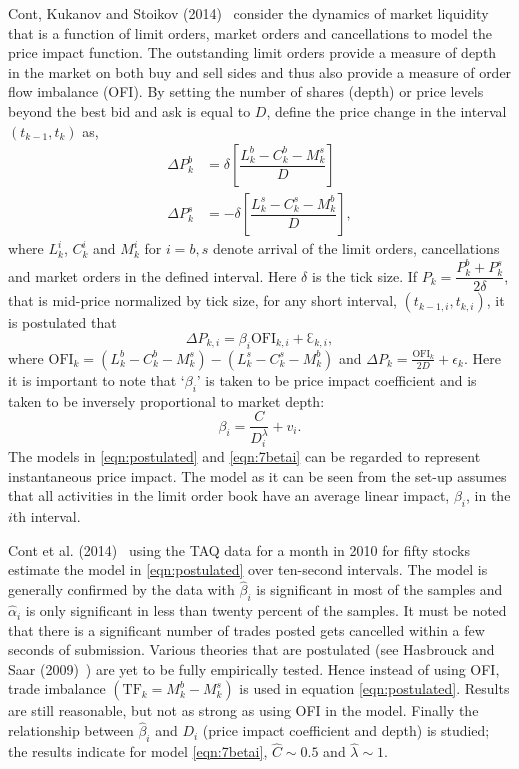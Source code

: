 Cont, Kukanov and Stoikov (2014)~\cite{contkulst} consider the dynamics of market liquidity that is a function of limit orders, market orders and cancellations to model the price impact function. The outstanding limit orders provide a measure of depth in the market on both buy and sell sides and thus also provide a measure of order flow imbalance (OFI). By setting the number of shares (depth) or price levels beyond the best bid and ask is equal to $D$, define the price change in the interval $(t_{k-1},t_k)$ as,
	\begin{equation}\label{eqn:doubleeq}
	\begin{split}
	\Delta P_k^b&= \delta \left[ \dfrac{L_k^b - C_k^b - M_k^s}{D} \right] \\
	\Delta P_k^s&= -\delta \left[\dfrac{L_k^s-C_k^s-M_k^b}{D}\right],
	\end{split}
	\end{equation}
where $L_k^i$, $C_k^i$ and $M_k^i$ for $i=b,s$ denote arrival of the limit orders, cancellations and market orders in the defined interval. Here $\delta$ is the tick size. If $P_k=\dfrac{P_k^b+P_k^s}{2\delta}$, that is mid-price normalized by tick size, for any short interval, $(t_{k-1,i},t_{k,i})$, it is postulated that
	\begin{equation}\label{eqn:postulated}
	\Delta P_{k,i} = \beta_i \text{OFI}_{k,i} + \Eulerconst_{k,i},
	\end{equation}
where $\text{OFI}_k=(L_k^b-C_k^b-M_k^s)-(L_k^s-C_k^s-M_k^b)$ and $\Delta P_k=\frac{\text{OFI}_k}{2D}+\epsilon_k$. Here it is important to note that `$\beta_i$' is taken to be price impact coefficient and is taken to be inversely proportional to market depth:
	\begin{equation} \label{eqn:7betai}
	\beta_i=\dfrac{C}{D_i^\lambda} + v_i.
	\end{equation}
The models in \eqref{eqn:postulated} and \eqref{eqn:7betai} can be regarded to represent instantaneous price impact. The model as it can be seen from the set-up assumes that all activities in the limit order book have an average linear impact, $\beta_i$, in the $i$th interval. 


Cont et al. (2014)~\cite{contkulst} using the TAQ data for a month in 2010 for fifty stocks estimate the model in \eqref{eqn:postulated} over ten-second intervals. The model is generally confirmed by the data with $\hat{\beta}_i$ is significant in most of the samples and $\hat{\alpha}_i$ is only significant in less than twenty percent of the samples. It must be noted that there is a significant number of trades posted gets cancelled within a few seconds of submission. Various theories that are postulated (see Hasbrouck and Saar (2009)~\cite{habbrooksaar}) are yet to be fully empirically tested. Hence instead of using OFI, trade imbalance $(\text{TF}_k=M_k^b-M_k^s)$ is used in equation \eqref{eqn:postulated}. Results are still reasonable, but not as strong as using OFI in the model. Finally the relationship between $\hat{\beta}_i$ and $D_i$ (price impact coefficient and depth) is studied; the results indicate for model \eqref{eqn:7betai}, $\hat{C} \sim 0.5$ and $\hat{\lambda} \sim 1$. 


